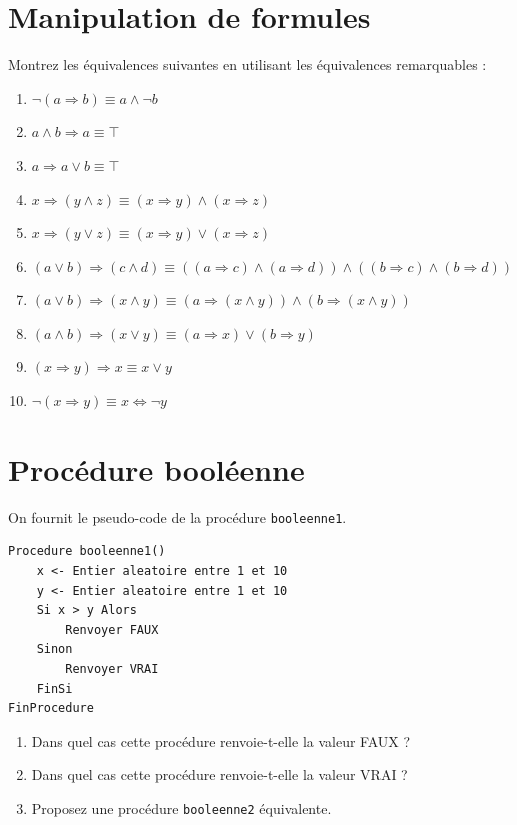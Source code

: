 \documentclass[a4paper,11pt]{article}
\begin{document}
\section{Manipulation de formules}

Montrez les équivalences suivantes en utilisant les équivalences remarquables :

\begin{enumerate}
\item $\neg(a \Rightarrow b) \equiv a \wedge \neg b$
\item $a \wedge b \Rightarrow a \equiv \top$
\item $a \Rightarrow a \vee b \equiv \top$
\item $x \Rightarrow (y \wedge z) \equiv (x \Rightarrow y) \wedge (x \Rightarrow z)$
\item $x \Rightarrow (y \vee z) \equiv (x \Rightarrow y) \vee (x \Rightarrow z)$
\item $(a \vee b) \Rightarrow (c \wedge d) \equiv ((a \Rightarrow c) \wedge (a \Rightarrow d)) \wedge ((b \Rightarrow c) \wedge (b \Rightarrow d))$
\item $(a \vee b) \Rightarrow (x \wedge y) \equiv (a \Rightarrow (x \wedge y)) \wedge (b \Rightarrow (x \wedge y))$
\item $(a \wedge b) \Rightarrow (x \vee y) \equiv (a \Rightarrow x) \vee (b \Rightarrow y)$
\item $(x \Rightarrow y) \Rightarrow x \equiv x \vee y$
\item $\neg(x \Rightarrow y) \equiv x \Leftrightarrow \neg y$
\end{enumerate}

\section{Procédure booléenne}

On fournit le pseudo-code de la procédure \texttt{booleenne1}.

\begin{lstlisting}
Procedure booleenne1()
    x <- Entier aleatoire entre 1 et 10
    y <- Entier aleatoire entre 1 et 10
    Si x > y Alors
        Renvoyer FAUX
    Sinon
        Renvoyer VRAI
    FinSi
FinProcedure
\end{lstlisting}

\begin{enumerate}
\item Dans quel cas cette procédure renvoie-t-elle la valeur FAUX ?
\item Dans quel cas cette procédure renvoie-t-elle la valeur VRAI ?
\item Proposez une procédure \texttt{booleenne2} équivalente.
\end{enumerate}
\end{document}
